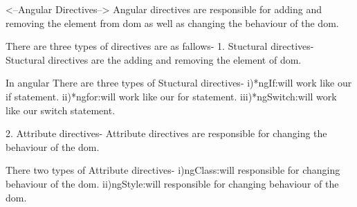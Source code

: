 <--Angular Directives-->
Angular directives are responsible for adding and removing the element 
from dom as well as changing the behaviour of the dom.

There are three types of directives are as fallows-
1. Stuctural directives-
Stuctural directives are the adding and removing the element of dom.

In angular There are three types of Stuctural directives-
i)*ngIf:will work like our if statement.
ii)*ngfor:will work like our for statement.
iii)*ngSwitch:will work like our switch statement.

2. Attribute  directives-
Attribute directives are responsible for changing the behaviour of the dom.

There two types of Attribute directives-
i)ngClass:will responsible for changing behaviour of the dom.
ii)ngStyle:will responsible for changing behaviour of the dom.



